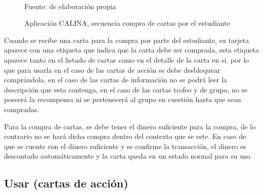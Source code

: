 \begin{figure}[!htb]
\caption[]{Aplicación CALINA, secuencia compra de cartas por el estudiante}
\centering
\begin{adjustbox}{width=15cm}
\end{adjustbox}
\\
{\footnotesize Fuente: de elaboración propia}
\end{figure}

Cuando se recibe una carta para la compra por parte del estudiante, su tarjeta aparece con una etiqueta que 
indica que la carta debe ser comprada, esta etiqueta aparece tanto en el listado de cartas como en el detalle 
de la carta en si, por lo que para usarla en el caso de las cartas de acción se debe desbloquear comprándola, 
en el caso de las cartas de información no se podrá leer la descripción que esta contenga, en el caso de las 
cartas trofeo y de grupo, no se poseerá la recompensa ni se pertenecerá al grupo en cuestión hasta que sean 
compradas.

Para la compra de cartas, se debe tener el dinero suficiente para la compra, de lo contrario no se hará dicha 
compra dentro del contexto que se este. En caso de que se cuente con el dinero suficiente y se confirme la 
transacción, el dinero es descontado automáticamente y la carta queda en un estado normal para su uso.

\subsection{Usar (cartas de acción)}

